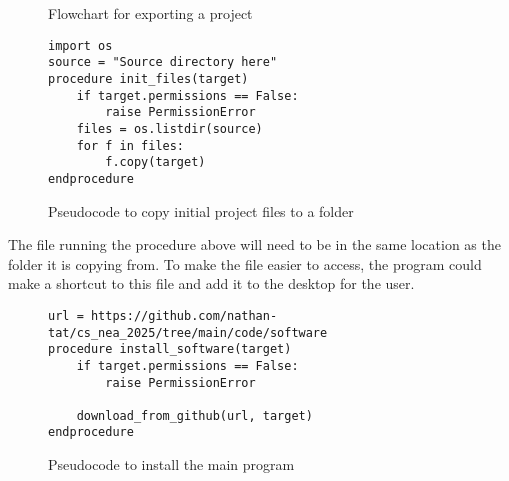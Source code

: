         \begin{figure}[!ht]
            \centering
            \caption{Flowchart for exporting a project}
            \label{flow:flowchart_design_c1}
        \end{figure}
        

        \begin{figure}[!ht]
            \begin{verbatim}
import os
source = "Source directory here"
procedure init_files(target)
    if target.permissions == False:
        raise PermissionError
    files = os.listdir(source)
    for f in files:
        f.copy(target)
endprocedure
            \end{verbatim}
            \caption{Pseudocode to copy initial project files to a folder}
            \label{pc:copy_to_folder_ps_c1}
        \end{figure}


        The file running the procedure above will need to be in the same location as the folder it is copying from. 
        To make the file easier to access, the program could make a shortcut to this file and add it to the desktop for the user.
        

        \begin{figure}[!ht]
            \begin{verbatim}
url = https://github.com/nathan-tat/cs_nea_2025/tree/main/code/software
procedure install_software(target)
    if target.permissions == False:
        raise PermissionError

    download_from_github(url, target)
endprocedure
            \end{verbatim}
            \caption{Pseudocode to install the main program}
            \label{pc:install_software_ps_c1}
        \end{figure}


